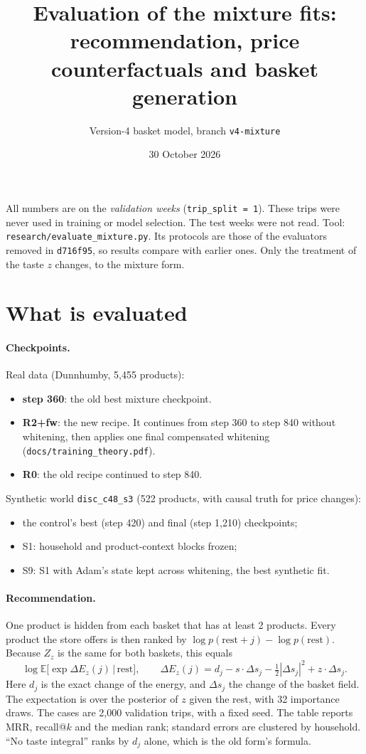 \documentclass[11pt]{article}
\title{Evaluation of the mixture fits: recommendation, price counterfactuals and basket generation}
\author{Version-4 basket model, branch \texttt{v4-mixture}}
\date{30 October 2026}
\newcommand{\E}{\mathbb{E}}
\begin{document}
\maketitle

\noindent All numbers are on the \emph{validation weeks} (\texttt{trip\_split = 1}). These trips were
never used in training or model selection. The test weeks were not read. Tool:
\texttt{research/evaluate\_mixture.py}. Its protocols are those of the evaluators removed in
\texttt{d716f95}, so results compare with earlier ones. Only the treatment of the taste $z$ changes,
to the mixture form.

\section{What is evaluated}

\paragraph{Checkpoints.} Real data (Dunnhumby, 5,455 products):
\begin{itemize}
\item \textbf{step 360}: the old best mixture checkpoint.
\item \textbf{R2+fw}: the new recipe. It continues from step 360 to step 840 without whitening,
  then applies one final compensated whitening (\texttt{docs/training\_theory.pdf}).
\item \textbf{R0}: the old recipe continued to step 840.
\end{itemize}
Synthetic world \texttt{disc\_c48\_s3} (522 products, with causal truth for price changes):
\begin{itemize}
\item the control's best (step 420) and final (step 1,210) checkpoints;
\item S1: household and product-context blocks frozen;
\item S9: S1 with Adam's state kept across whitening, the best synthetic fit.
\end{itemize}

\paragraph{Recommendation.} One product is hidden from each basket that has at least 2 products.
Every product the store offers is then ranked by $\log p(\text{rest}+j)-\log p(\text{rest})$. Because
$Z_z$ is the same for both baskets, this equals
\[
\log \E\bigl[\exp\Delta E_z(j)\,\big|\,\text{rest}\bigr],\qquad
\Delta E_z(j)=d_j-s\cdot\Delta s_j-\tfrac12|\Delta s_j|^2+z\cdot\Delta s_j .
\]
Here $d_j$ is the exact change of the energy, and $\Delta s_j$ the change of the basket field. The
expectation is over the posterior of $z$ given the rest, with 32 importance draws. The cases are
2,000 validation trips, with a fixed seed. The table reports MRR, recall@$k$ and the median rank;
standard errors are clustered by household. ``No taste integral'' ranks by $d_j$ alone, which is
the old form's formula.
\end{document}
